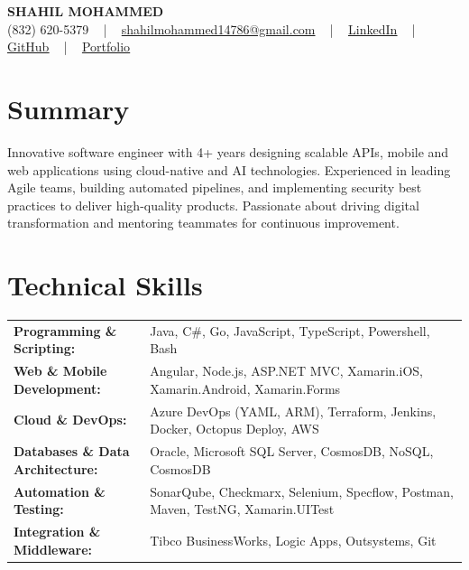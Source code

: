 \documentclass[letterpaper,11pt]{article}
\begin{document}
\begin{center}
    {\fontsize{14pt}{12pt}\selectfont \textbf{\MakeUppercase{Shahil Mohammed}}}\\ \vspace{2pt}
    \fontsize{10pt}{12pt}\selectfont (832) 620-5379 ~ | ~ \href{mailto:shahilmohammed14786@gmail.com}{shahilmohammed14786@gmail.com} ~ | ~  
    \href{https://www.linkedin.com/in/shahil-mohammed-9652931a1/}{\color{blue}\underline{LinkedIn}}  ~ | ~ 
    \href{https://github.com/freakbeast14}{\color{blue}\underline{GitHub}} ~ | ~ 
    \href{https://shahil-mohammed.netlify.app/}{\color{blue}\underline{Portfolio}}
    \vspace{-8pt}
\end{center}

\section{Summary}
\fontsize{9pt}{10pt}\selectfont
Innovative software engineer with 4+ years designing scalable APIs, mobile and web applications using cloud-native and AI technologies. Experienced in leading Agile teams, building automated pipelines, and implementing security best practices to deliver high-quality products. Passionate about driving digital transformation and mentoring teammates for continuous improvement.
 \vspace{-5pt}
 
\section{Technical Skills}
        \vspace{-14pt}
        \begin{table}[h]
            \fontsize{9pt}{10pt}\selectfont
            \begin{tabular}{p{0.3\linewidth} p{0.7\linewidth}}
                \textbf{Programming \& Scripting:} & Java, C\#, Go, JavaScript, TypeScript, Powershell, Bash \\
                \textbf{Web \& Mobile Development:} & Angular, Node.js, ASP.NET MVC, Xamarin.iOS, Xamarin.Android, Xamarin.Forms \\
                \textbf{Cloud \& DevOps:} & Azure DevOps (YAML, ARM), Terraform, Jenkins, Docker, Octopus Deploy, AWS \\
                \textbf{Databases \& Data Architecture:} & Oracle, Microsoft SQL Server, CosmosDB, NoSQL, CosmosDB \\
                \textbf{Automation \& Testing:} & SonarQube, Checkmarx, Selenium, Specflow, Postman, Maven, TestNG, Xamarin.UITest \\
                \textbf{Integration \& Middleware:} & Tibco BusinessWorks, Logic Apps, Outsystems, Git \\
            \end{tabular}
        \end{table}
 \vspace{-15pt}
 
\end{document}
